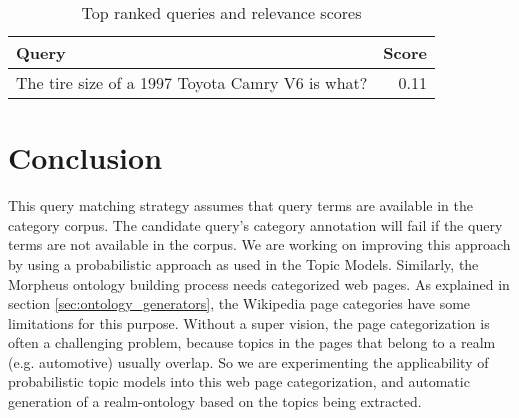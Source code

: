 \begin{table}[h]\footnotesize

\begin{tabular}{l | r}
Query & Score\\
\hline
The tire size of a 1997 Toyota Camry V6 is what? & 0.11\\ 
\hline
\end{tabular}        

\caption{Top ranked queries and relevance scores}
\label{tbl:ranked_queries}   

\end{table}


\section{Conclusion}
This query matching strategy assumes that query terms are available in the
category corpus. The candidate query's category annotation will fail if the
query terms are not available in the corpus. We are working on improving this
approach by using a probabilistic approach as used in the Topic
Models\cite{Blei2003latentdirichlet}. Similarly, the Morpheus ontology building
process needs categorized web pages. As explained in section
\ref{sec:ontology_generators}, the Wikipedia page categories have some
limitations for this purpose. Without a super vision, the page categorization is
often a challenging problem, because topics in the pages that belong to a realm
(e.g. automotive) usually overlap. So we are experimenting the applicability of
probabilistic topic models into this web page categorization, and automatic
generation of a realm-ontology based on the topics being extracted.            
 



